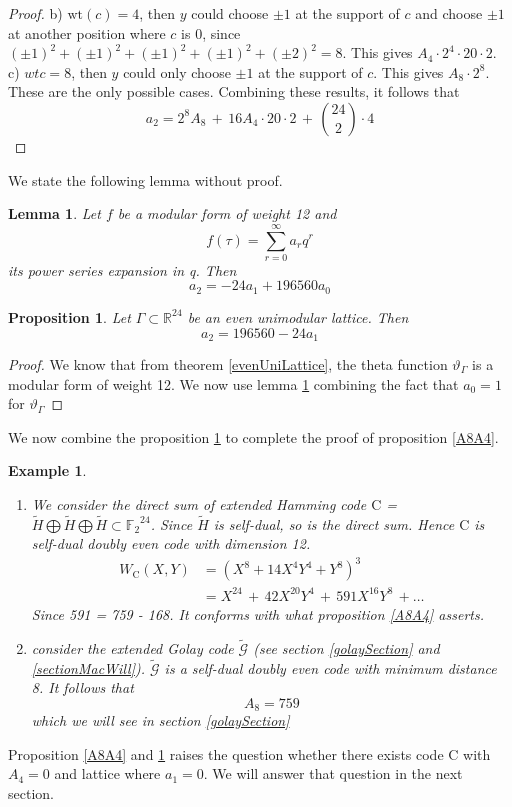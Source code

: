 \documentclass{article}
\newtheorem{lemma}[theorem]{Lemma}
\newtheorem{example}[theorem]{Example}
\newtheorem{prop}[theorem]{Proposition}
\numberwithin{equation}{theorem}
\numberwithin{figure}{theorem}
\newcommand{\Ftwo}{\ensuremath{\mathbb{F}_2}}
\newcommand{\cCodes}{\ensuremath{\widetilde{\mathscr{G}}}}
\newcommand{\simpleCodes}{\ensuremath{\mathrm{C}}}
\newcommand{\weightEnumerator}[3]{\ensuremath{W_{#1}(#2,#3)}}
\newcommand{\thetaFunction}[1]{\ensuremath{\vartheta_{#1}}}
\newcommand{\wt}[1]{\ensuremath{\text{wt}(#1)}}
\newcommand{\Real}{\ensuremath{\mathbb{R}}}
\begin{document}
\begin{proof}
b) $\wt{c} = 4$, then $y$ could choose $\pm1$ at the support of $c$ and choose $\pm1$ at another position where $c$ is 0, since $(\pm1)^2 + (\pm1)^2+ (\pm1)^2+ (\pm1)^2 + (\pm2)^2 = 8$. This gives $A_4 \cdot 2^4 \cdot 20 \cdot 2$.\\
c) $wt{c} = 8$, then $y$ could only choose $\pm1$ at the support of $c$. This gives $A_8 \cdot 2^8$.\\
These are the only possible cases. Combining these results, it follows that 
\begin{equation}\label{a2A8A4Eqn}
	a_2 = 2^8A_8 \, + \,  16 A_4 \cdot 20 \cdot 2 \, + \, \binom{24}{2}\cdot 4
\end{equation}
\end{proof}
We state the following lemma without proof.
\begin{lemma}\label{a2a0a1}
Let $f$ be a modular form of weight 12 and
\[
	f(\tau) = \sum_{r = 0}^{\infty}a_rq^r
\]
its power series expansion in q. Then
\[
	a_2 = -24a_1 + 196560a_0
\]
\end{lemma}
\begin{prop}\label{a2a1}
Let $\Gamma \subset \Real^24$ be an even unimodular lattice. Then 
\[
	a_2 = 196560 - 24a_1
\] 
\end{prop}
\begin{proof}
We know that from theorem \ref{evenUniLattice}, the theta function $\thetaFunction{\Gamma}$ is a modular form of weight 12. We now use lemma \ref{a2a0a1} combining the fact that $a_0 = 1$ for $\thetaFunction{\Gamma}$
\end{proof}
We now combine the proposition \ref{a2a1} to complete the proof of proposition \ref{A8A4}.

\begin{example}\label{exampleA8A4}
\begin{enumerate}
	\item
We consider the direct sum of extended Hamming code {\simpleCodes} = $\widetilde{H} \bigoplus \widetilde{H} \bigoplus \widetilde{H} \subset \Ftwo^{24}$. Since $\widetilde{H}$ is self-dual, so is the direct sum. Hence {\simpleCodes} is self-dual doubly even code with dimension 12.\\
\begin{align*}
	\weightEnumerator{\simpleCodes}{X}{Y} &= (X^8 + 14X^4Y^4 + Y^8)^3 \\
	&= X^{24} \,+\, 42X^{20}Y^4 \,+\, 591X^{16}Y^8 \, + \ldots
\end{align*}
Since 591 = 759 - 168. It conforms with what proposition \ref{A8A4} asserts.
\item
consider the extended Golay code {\cCodes} (see section \ref{golaySection} and \ref{sectionMacWill}).  {\cCodes} is a self-dual doubly even code with minimum distance 8. It follows that
\[
	A_8 = 759
\]
which we will see in section \ref{golaySection}
\end{enumerate}
\end{example}
Proposition \ref{A8A4} and \ref{a2a1} raises the question whether there exists code $\simpleCodes$ with $A_4 = 0$ and lattice where $a_1 = 0$. We will answer that question in the next section.
\newpage
\end{document}
